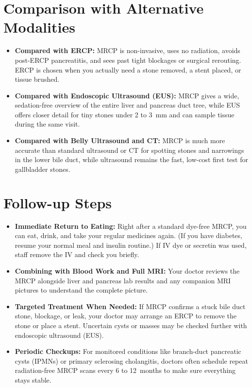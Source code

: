 \section{Comparison with Alternative Modalities}
\begin{itemize}
\item \textbf{Compared with ERCP:} MRCP is non-invasive, uses no radiation, avoids post-ERCP pancreatitis, and sees past tight blockages or surgical rerouting. ERCP is chosen when you actually need a stone removed, a stent placed, or tissue brushed.
\item \textbf{Compared with Endoscopic Ultrasound (EUS):} MRCP gives a wide, sedation-free overview of the entire liver and pancreas duct tree, while EUS offers closer detail for tiny stones under 2 to 3~mm and can sample tissue during the same visit.
\item \textbf{Compared with Belly Ultrasound and CT:} MRCP is much more accurate than standard ultrasound or CT for spotting stones and narrowings in the lower bile duct, while ultrasound remains the fast, low-cost first test for gallbladder stones.
\end{itemize}

\section{Follow-up Steps}
\begin{itemize}
\item \textbf{Immediate Return to Eating:} Right after a standard dye-free MRCP, you can eat, drink, and take your regular medicines again. (If you have diabetes, resume your normal meal and insulin routine.) If IV dye or secretin was used, staff remove the IV and check you briefly.
\item \textbf{Combining with Blood Work and Full MRI:} Your doctor reviews the MRCP alongside liver and pancreas lab results and any companion MRI pictures to understand the complete picture.
\item \textbf{Targeted Treatment When Needed:} If MRCP confirms a stuck bile duct stone, blockage, or leak, your doctor may arrange an ERCP to remove the stone or place a stent. Uncertain cysts or masses may be checked further with endoscopic ultrasound (EUS).
\item \textbf{Periodic Checkups:} For monitored conditions like branch-duct pancreatic cysts (IPMNs) or primary sclerosing cholangitis, doctors often schedule repeat radiation-free MRCP scans every 6 to 12~months to make sure everything stays stable.
\end{itemize}

